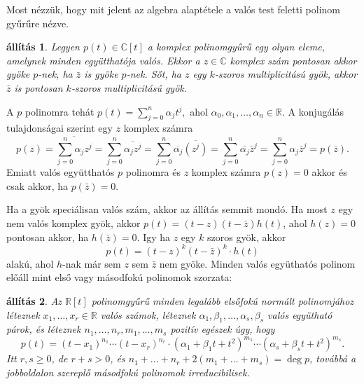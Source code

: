 \documentclass[9pt, showtrims]{memoir}
\makeatletter
\renewenvironment{proof}[1][\proofname]
    {\par\pushQED{\qed}%
    \normalfont \topsep6\p@\@plus6\p@\relax
    \trivlist
    \item[\hskip\labelsep
        \itshape
    #1\@addpunct{:}]\ignorespaces}
    {\popQED\endtrivlist\@endpefalse}
\theoremstyle{plain}
\newtheorem{proposition}{állítás}[section]
\theoremstyle{remark}
\theoremstyle{definition}
\makeatother
\begin{document}
Most nézzük, hogy mit jelent az algebra alaptétele a valós test feletti polinom gyűrűre nézve.
\begin{proposition}
    Legyen $p\left( t \right)\in\mathbb{C}[t]$ a komplex polinomgyűrű egy olyan eleme, 
    amelynek minden együtthatója valós.
    Ekkor a $z\in \mathbb{C}$ komplex szám pontosan akkor gyöke $p$-nek, 
    ha $\bar{z}$ is gyöke $p$-nek.
    Sőt, ha $z$ egy $k$-szoros multiplicitású gyök, 
    akkor $\bar{z}$ is pontosan $k$-szoros multiplicitású gyök.
\end{proposition}
\begin{proof}
    A $p$ polinomra tehát 
    \begin{math}
        p\left( t \right)
        =
        \sum_{j=0}^n\alpha_jt^j,
    \end{math}
    ahol $\alpha_0,\alpha_1,\dots,\alpha_n\in\mathbb{R}$.
    A konjugálás tulajdonságai szerint egy $z$ komplex számra
    \[
        p\left( z \right)=
        \overline{
        \sum_{j=0}^n\alpha_jz^j
        }
        =
        \sum_{j=0}^n\overline{\alpha_jz^j}
        =
        \sum_{j=0}^n\overline{\alpha_j}\overline{(z^j)}
        =
        \sum_{j=0}^n\bar{\alpha_j}\bar{z}^j
        =
        \sum_{j=0}^n\alpha_j\bar{z}^j
        =
        p\left(\bar{z} \right).
    \]
    Emiatt valós együtthatós $p$ polinomra és $z$ komplex számra 
    $p\left( z \right)=0$ akkor és csak akkor, ha $p\left( \bar{z} \right)=0.$

    Ha a gyök speciálisan valós szám, akkor az állítás semmit mondó.
    Ha most $z$ egy nem valós komplex gyök,
    akkor $p(t)=\left( t-z \right)\left( t-\bar{z} \right)h\left( t \right)$, ahol 
    $h\left( z \right)=0$ pontosan akkor, ha $h\left( \bar{z} \right)=0$.
    Igy ha $z$ egy $k$ szoros gyök,
    akkor
    \[
        p\left( t \right)=\left( t-z \right)^{k}\left( t-\bar{z} \right)^{k}\cdot h\left( t \right)
    \]
    alakú, ahol $h$-nak már sem $z$ sem $\bar{z}$ nem gyöke.
\end{proof}
Minden valós együthatós polinom előáll mint első vagy másodfokú polinomok szorzata:
\begin{proposition}
    Az $\mathbb{R}[t]$ polinomgyűrű minden legalább elsőfokú normált polinomjához
    léteznek $x_1,\dots,x_r\in\mathbb{R}$ valós számok,
    léteznek $\alpha_1,\beta_1,\dots,\alpha_s,\beta_s$ valós együtható párok, 
    és léteznek
    $n_1,\dots,n_r, m_1,\dots,m_s$ pozitív egészek úgy, hogy
    \[
        p\left( t \right)
        =
        \left( t-x_1 \right)^{n_1}
        \cdots
        \left( t-x_r \right)^{n_r}
        \cdot
        \left(\alpha_1 + \beta_1t +t^2\right)^{m_1}
        \cdots
        \left(\alpha_s + \beta_st +t^2\right)^{m_s}.
    \]
    Itt $r,s\geq 0$, de $r+s>0$, és $n_1+\dots+n_r+2\left( m_1+\dots+m_s \right)=\deg p$, 
    továbbá a jobboldalon szereplő másodfokú polinomok irreducibilisek.
\end{proposition}
\end{document}
